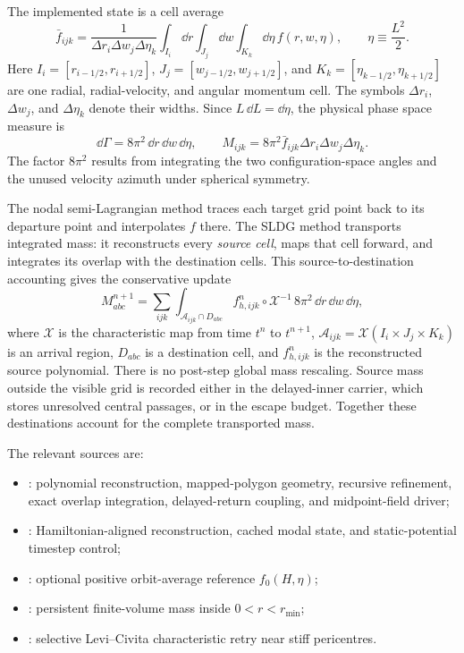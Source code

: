 The implemented state is a cell average
\[
 \bar f_{ijk}
 =\frac{1}{\Delta r_i\Delta w_j\Delta\eta_k}
   \int_{I_i}\!\dd r\int_{J_j}\!\dd w\int_{K_k}\!\dd\eta\,
   f(r,w,\eta),
 \qquad \eta\equiv\frac{L^2}{2}.
\]
Here \(I_i=[r_{i-1/2},r_{i+1/2}]\), \(J_j=[w_{j-1/2},w_{j+1/2}]\),
and \(K_k=[\eta_{k-1/2},\eta_{k+1/2}]\) are one radial, radial-velocity,
and angular momentum cell.  The symbols
\(\Delta r_i\), \(\Delta w_j\), and \(\Delta\eta_k\) denote their widths.
Since \(L\,\dd L=\dd\eta\), the physical phase space measure is
\[
 \dd\Gamma=8\pi^2\,\dd r\,\dd w\,\dd\eta,
 \qquad
 M_{ijk}=8\pi^2\bar f_{ijk}
          \Delta r_i\Delta w_j\Delta\eta_k .
\]
The factor \(8\pi^2\) results from integrating the two configuration-space
angles and the unused velocity azimuth under spherical symmetry.

The nodal semi-Lagrangian method traces each target grid point back to its
departure point and interpolates \(f\) there.  The SLDG method transports
integrated mass: it reconstructs every \emph{source cell}, maps that cell
forward, and integrates its overlap with the destination cells.  This
source-to-destination accounting gives the conservative update
\[
 M^{n+1}_{abc}
 =\sum_{ijk}
   \int_{\mathcal A_{ijk}\cap D_{abc}}
   f^n_{h,ijk}\circ\mathcal X^{-1}\,
   8\pi^2\,\dd r\,\dd w\,\dd\eta ,
\]
where \(\mathcal X\) is the characteristic map from time \(t^n\) to
\(t^{n+1}\), \(\mathcal A_{ijk}=\mathcal X(I_i\times J_j\times K_k)\)
is an arrival region, \(D_{abc}\) is a destination cell, and
\(f^n_{h,ijk}\) is the reconstructed source polynomial.  There is no
post-step global mass rescaling.  Source mass outside the visible grid is
recorded either in the delayed-inner carrier, which stores unresolved central
passages, or in the escape budget.  Together these destinations account for
the complete transported mass.

The relevant sources are:
\begin{itemize}
\item {}: polynomial
reconstruction, mapped-polygon geometry, recursive refinement, exact overlap
integration, delayed-return coupling, and midpoint-field driver;
\item {}: Hamiltonian-aligned
reconstruction, cached modal state, and static-potential timestep control;
\item {}: optional positive
orbit-average reference \(f_0(H,\eta)\);
\item {}: persistent
finite-volume mass inside \(0<r<r_{\min}\);
\item {}: selective
Levi--Civita characteristic retry near stiff pericentres.
\end{itemize}

